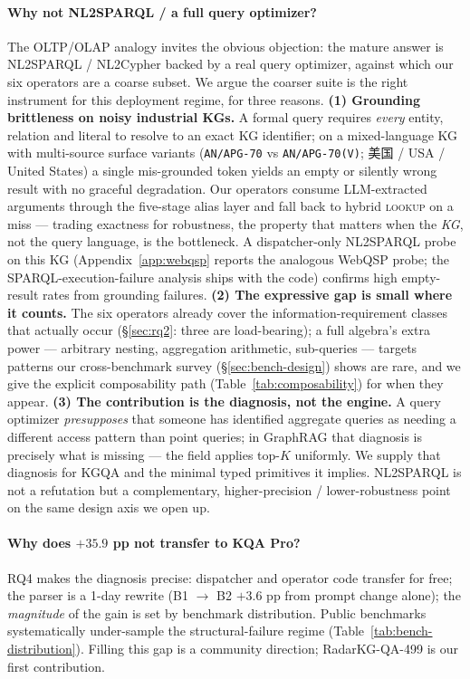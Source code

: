 \documentclass[review]{elsarticle}
\newcommand{\op}[1]{\textsc{\small #1}}
\begin{document}
\paragraph{Why not NL2SPARQL / a full query optimizer?}
The OLTP/OLAP analogy invites the obvious objection: the mature answer is NL2SPARQL / NL2Cypher backed by a real query optimizer, against which our six operators are a coarse subset. We argue the coarser suite is the right instrument for this deployment regime, for three reasons. \textbf{(1) Grounding brittleness on noisy industrial KGs.} A formal query requires \emph{every} entity, relation and literal to resolve to an exact KG identifier; on a mixed-language KG with multi-source surface variants (\texttt{AN/APG-70} vs \texttt{AN/APG-70(V)}; 美国 / USA / United States) a single mis-grounded token yields an empty or silently wrong result with no graceful degradation. Our operators consume LLM-extracted arguments through the five-stage alias layer and fall back to hybrid \op{lookup} on a miss --- trading exactness for robustness, the property that matters when the \emph{KG}, not the query language, is the bottleneck. A dispatcher-only NL2SPARQL probe on this KG (Appendix~\ref{app:webqsp} reports the analogous WebQSP probe; the SPARQL-execution-failure analysis ships with the code) confirms high empty-result rates from grounding failures. \textbf{(2) The expressive gap is small where it counts.} The six operators already cover the information-requirement classes that actually occur (§\ref{sec:rq2}: three are load-bearing); a full algebra's extra power --- arbitrary nesting, aggregation arithmetic, sub-queries --- targets patterns our cross-benchmark survey (§\ref{sec:bench-design}) shows are rare, and we give the explicit composability path (Table~\ref{tab:composability}) for when they appear. \textbf{(3) The contribution is the diagnosis, not the engine.} A query optimizer \emph{presupposes} that someone has identified aggregate queries as needing a different access pattern than point queries; in GraphRAG that diagnosis is precisely what is missing --- the field applies top-$K$ uniformly. We supply that diagnosis for KGQA and the minimal typed primitives it implies. NL2SPARQL is not a refutation but a complementary, higher-precision / lower-robustness point on the same design axis we open up.

\paragraph{Why does \texorpdfstring{$+35.9$}{+35.9} pp not transfer to KQA Pro?}
RQ4 makes the diagnosis precise: dispatcher and operator code transfer for free; the parser is a 1-day rewrite (B1 $\to$ B2 $+3.6$ pp from prompt change alone); the \emph{magnitude} of the gain is set by benchmark distribution. Public benchmarks systematically under-sample the structural-failure regime (Table~\ref{tab:bench-distribution}). Filling this gap is a community direction; RadarKG-QA-499 is our first contribution.
\end{document}
